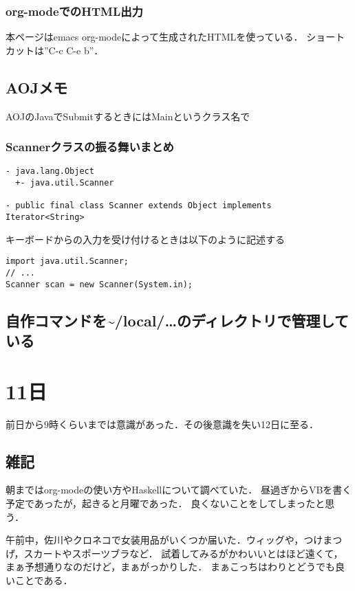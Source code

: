 \documentclass[11pt]{article}
\begin{document}
\subsubsection{org-modeでのHTML出力}
\label{sec-2-2-4}

本ページはemacs org-modeによって生成されたHTMLを使っている．
ショートカットは''C-c C-e b''．
\subsection{AOJメモ}
\label{sec-2-3}

AOJのJavaでSubmitするときにはMainというクラス名で
\subsubsection{Scannerクラスの振る舞いまとめ}
\label{sec-2-3-1}




\begin{verbatim}
- java.lang.Object
  +- java.util.Scanner

- public final class Scanner extends Object implements Iterator<String>
\end{verbatim}
キーボードからの入力を受け付けるときは以下のように記述する


\begin{verbatim}
import java.util.Scanner;
// ...
Scanner scan = new Scanner(System.in);
\end{verbatim}
\subsection{自作コマンドを\~{}/local/\ldots{}のディレクトリで管理している}
\label{sec-2-4}
\section{11日}
\label{sec-3}

前日から9時くらいまでは意識があった．その後意識を失い12日に至る．
\subsection{雑記}
\label{sec-3-1}

朝まではorg-modeの使い方やHaskellについて調べていた．
昼過ぎからVBを書く予定であったが，起きると月曜であった．
良くないことをしてしまったと思う．

午前中，佐川やクロネコで女装用品がいくつか届いた．ウィッグや，つけまつげ，スカートやスポーツブラなど．
試着してみるがかわいいとはほど遠くて，まぁ予想通りなのだけど，まぁがっかりした．
まぁこっちはわりとどうでも良いことである．
\end{document}
